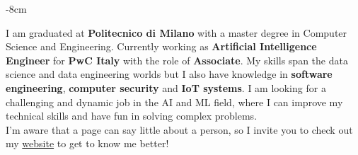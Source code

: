 \documentclass[10pt,a4paper]{altacv}
\begin{document}






\begin{adjustwidth}{}{-8cm}
\makecvheader
\end{adjustwidth}

I am graduated at \textbf{Politecnico di Milano} with a master degree in Computer Science and Engineering.
Currently working as \textbf{Artificial Intelligence Engineer} for \textbf{PwC Italy} with the role of \textbf{Associate}.
My skills span the data science and data engineering worlds but I also have knowledge in \textbf{software engineering}, \textbf{computer security} and \textbf{IoT systems}.
I am looking for a challenging and dynamic job in the AI and ML field, where I can improve my technical skills and have fun in solving complex problems. \\I'm aware that a page can say little about a person, so I invite you to check out my \href{https://mmarini.it}{website} to get to know me better!

\end{document}
